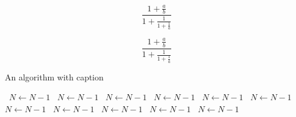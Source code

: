 \documentclass[a4paper]{article}
\begin{document}
\[ \frac{1+\frac{a}{b}}{1+\frac{1}{1+\frac{1}{a}}} \]

\[ \frac{1+\frac{a}{b}}{1+\frac{1}{1+\frac{1}{a}}} \]

\begin{algorithm}
\caption{An algorithm with caption}
\begin{algorithmic}
\    \State $N \gets N - 1$
\    \State $N \gets N - 1$
\    \State $N \gets N - 1$
\    \State $N \gets N - 1$
\    \State $N \gets N - 1$
\    \State $N \gets N - 1$
\    \State $N \gets N - 1$
\    \State $N \gets N - 1$
\    \State $N \gets N - 1$
\    \State $N \gets N - 1$
\    \State $N \gets N - 1$
\EndWhile
\end{algorithmic}
\end{algorithm}
\end{document}
